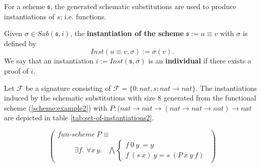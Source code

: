 For a scheme $\mathfrak{s}$, the generated schematic substitutions are used to produce instantiations of $s$; i.e. functions.

\begin{defn}
Given $\sigma \in Sub(\mathfrak{s},i)$, the {\bf instantiation of the scheme} $\mathfrak{s}:=u \equiv v$ with $\sigma$ is defined by
\begin{displaymath}
Inst(u \equiv v,\sigma) := \sigma(v).
\end{displaymath}
We say that an instantiation $i := Inst(\mathfrak{s}, \sigma)$ is an {\bf individual} if there exists a proof of $i$.
\end{defn}

\begin{example}
\label{example-instantiations}
Let $\mathcal{F}$ be a signature consisting of $\mathcal{F}=\{0:nat, s:nat \to nat\}$. The instantiations induced by the schematic substitutions with size 8 generated from the functional scheme (\ref{scheme:example2}) with $P : (nat \to nat \to (nat \to nat \to nat) \to nat$ are depicted in table \ref{tab:set-of-instantiations2}.

\begin{equation}
\left(\begin{array}{l}
fun\textrm{-}scheme\ P \equiv \\
\quad \quad \begin{array}{c}
\exists f.\,\, \forall x\, y. \phantom{,}
\end{array}
\bigwedge \left\{
	\begin{array}{l}
			f\ 0\ y\  = y \\
			f\ (s\ x)\ y = s\ (P\ x\ y\ f)
	\end{array}
  \right.
\end{array}\right)
\label{scheme:example2}
\end{equation}


\end{example}
